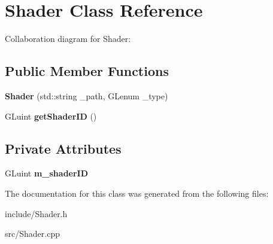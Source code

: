 \hypertarget{class_shader}{\section{Shader Class Reference}
\label{class_shader}
}


Collaboration diagram for Shader\-:
\subsection*{Public Member Functions}
\begin{DoxyCompactItemize}
\item 
\hypertarget{class_shader_ae973667b5383636897d8016ae15a5302}{{\bfseries Shader} (std\-::string \-\_\-path, G\-Lenum \-\_\-type)}\label{class_shader_ae973667b5383636897d8016ae15a5302}

\item 
\hypertarget{class_shader_ad0830d19bbdfafd2162af96008a039fb}{G\-Luint {\bfseries get\-Shader\-I\-D} ()}\label{class_shader_ad0830d19bbdfafd2162af96008a039fb}

\end{DoxyCompactItemize}
\subsection*{Private Attributes}
\begin{DoxyCompactItemize}
\item 
\hypertarget{class_shader_aaa52026dcc3cb96ac62ec62141732f31}{G\-Luint {\bfseries m\-\_\-shader\-I\-D}}\label{class_shader_aaa52026dcc3cb96ac62ec62141732f31}

\end{DoxyCompactItemize}


The documentation for this class was generated from the following files\-:\begin{DoxyCompactItemize}
\item 
include/Shader.\-h\item 
src/Shader.\-cpp\end{DoxyCompactItemize}
